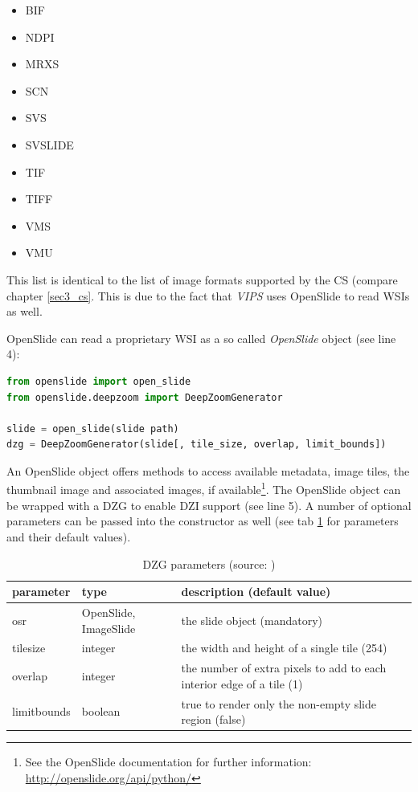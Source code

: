 \begin{itemize}
	\item BIF
	\item NDPI
	\item MRXS
	\item SCN
	\item SVS
	\item SVSLIDE
	\item TIF
	\item TIFF
	\item VMS
	\item VMU
\end{itemize}

This list is identical to the list of image formats supported by the CS (compare chapter \ref{sec3_cs}. This is due to the fact that \emph{VIPS} uses OpenSlide to read WSIs as well\cite{web:vips}.

OpenSlide can read a proprietary WSI as a so called \emph{OpenSlide} object (see line 4):

\begin{lstlisting}[language=python, frame=single]
from openslide import open_slide
from openslide.deepzoom import DeepZoomGenerator

slide = open_slide(slide path)
dzg = DeepZoomGenerator(slide[, tile_size, overlap, limit_bounds])
\end{lstlisting}

An OpenSlide object offers methods to access available metadata, image tiles, the thumbnail image and associated images, if available\footnote{
	See the OpenSlide documentation for further information: \url{http://openslide.org/api/python/}
}. The OpenSlide object can be wrapped with a DZG to enable DZI support (see line 5)\cite{web:openslide}. A number of optional parameters can be passed into the constructor as well (see tab \ref{tab4_DZGparam} for parameters and their default values).

\begin{table}[H]
	\begin{center}
		\begin{tabular}{| p{2.5cm} | p{2cm} | p{5.5cm} |}
			\hline
			\textbf{parameter} & \textbf{type} & \textbf{description (default value)}\\ \hline
			osr & OpenSlide, ImageSlide & the slide object (mandatory)
			\\ \hline
			tile{\textunderscore}size & integer & the width and height of a single tile (254)\\ \hline
			overlap & integer & the number of extra pixels to add to each interior edge of a tile (1)\\ \hline
			limit{\textunderscore}bounds & boolean & true to render only the non-empty slide region (false)\\ \hline
		\end{tabular}
		\caption{DZG parameters (source: \cite{web:openslide})}
		\label{tab4_DZGparam}
	\end{center}
\end{table}

